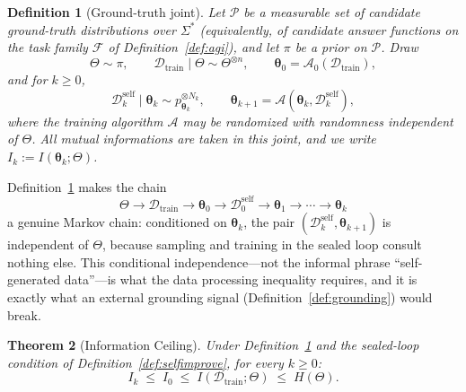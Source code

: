 \documentclass[11pt,a4paper]{article}
\newtheorem{theorem}{Theorem}[section]
\newtheorem{definition}[theorem]{Definition}
\begin{document}
\begin{definition}[Ground-truth joint]
\label{def:joint}
Let $\mathcal{P}$ be a measurable set of candidate ground-truth distributions over $\Sigma^*$ (equivalently, of candidate answer functions on the task family $\mathcal{F}$ of Definition~\ref{def:agi}), and let $\pi$ be a prior on $\mathcal{P}$. Draw
\begin{equation}
\Theta \sim \pi, \qquad
\mathcal{D}_{\mathrm{train}} \mid \Theta \sim \Theta^{\otimes n}, \qquad
\bm{\theta}_0 = \mathcal{A}_0(\mathcal{D}_{\mathrm{train}}),
\end{equation}
and for $k \geq 0$,
\begin{equation}
\mathcal{D}_k^{\mathrm{self}} \mid \bm{\theta}_k \sim p_{\bm{\theta}_k}^{\otimes N_k}, \qquad
\bm{\theta}_{k+1} = \mathcal{A}(\bm{\theta}_k, \mathcal{D}_k^{\mathrm{self}}),
\end{equation}
where the training algorithm $\mathcal{A}$ may be randomized with randomness independent of $\Theta$. All mutual informations are taken in this joint, and we write $I_k := I(\bm{\theta}_k; \Theta)$.
\end{definition}

Definition~\ref{def:joint} makes the chain
\begin{equation}
\Theta \to \mathcal{D}_{\mathrm{train}} \to \bm{\theta}_0 \to \mathcal{D}_0^{\mathrm{self}} \to \bm{\theta}_1 \to \cdots \to \bm{\theta}_k
\label{eq:chain}
\end{equation}
a genuine Markov chain: conditioned on $\bm{\theta}_k$, the pair $(\mathcal{D}_k^{\mathrm{self}}, \bm{\theta}_{k+1})$ is independent of $\Theta$, because sampling and training in the sealed loop consult nothing else. This conditional independence---not the informal phrase ``self-generated data''---is what the data processing inequality requires, and it is exactly what an external grounding signal (Definition~\ref{def:grounding}) would break.

\begin{theorem}[Information Ceiling]
\label{thm:info_ceiling}
Under Definition~\ref{def:joint} and the sealed-loop condition of Definition~\ref{def:selfimprove}, for every $k \geq 0$:
\begin{equation}
I_k \;\leq\; I_0 \;\leq\; I(\mathcal{D}_{\mathrm{train}}; \Theta) \;\leq\; H(\Theta).
\end{equation}
\end{theorem}
\end{document}
